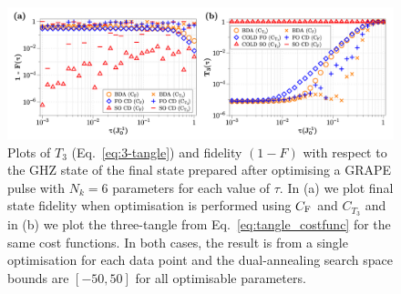 \begin{figure}[t]
    \centering
    \includegraphics[width=\linewidth]{images/tangle_plots.png} \caption[Preparing 3-spin GHZ states using the 3-tangle as a metric.]{Plots of $T_3$ (Eq.~\eqref{eq:3-tangle}) and fidelity $(1 - F)$ with respect to the GHZ state of the final state prepared after optimising a GRAPE pulse with $N_k = 6$ parameters for each value of $\tau$. In (a) we plot final state fidelity when optimisation is performed using $C_{\rm F}$ and $C_{T_3}$ and in (b) we plot the three-tangle from Eq.~\eqref{eq:tangle_costfunc} for the same cost functions. In both cases, the result is from a single optimisation for each data point and the dual-annealing search space bounds are $[-50,50]$ for all optimisable parameters.}\label{fig:tangle_v_fidelity}
\end{figure}

